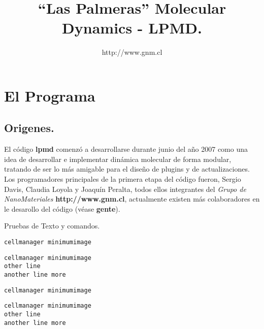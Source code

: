 \documentclass[a4paper,10pt]{scrbook}
\newcommand{\lpmd}{\textbf{lpmd }}
\newcommand{\control}[1]{\begin{center}\begin{minipage}{10cm}\texttt{#1}\end{minipage}\end{center}}
\begin{document}
\author{http://www.gnm.cl}
\title{``Las Palmeras'' Molecular Dynamics - \textbf{LPMD}.}
\maketitle

\tableofcontents
\chapter{El Programa}
\label{chap:lpmd}

\section{Origenes.}

El c\'odigo \lpmd comenz\'o a desarrollarse durante junio del a\~no 2007 como una idea de desarrollar e implementar din\'amica molecular de forma modular, tratando de ser lo m\'as amigable para el dise\~no de plugins y de actualizaciones. Los programadores principales de la primera etapa del c\'odigo fueron, Sergio Davis, Claudia Loyola y Joaqu\'in Peralta, todos ellos integrantes del \textit{Grupo de NanoMateriales} \textbf{http://www.gnm.cl}, actualmente existen m\'as colaboradores en le desarollo del c\'odigo (v\'ease \textbf{gente}).

Pruebas de Texto y comandos.

\begin{center}
\texttt{cellmanager minimumimage}
\end{center}

\control{cellmanager minimumimage \\ other line \\ another line more}


\begin{minipage}[c]{10cm}
 \texttt{cellmanager minimumimage}
\end{minipage}

\begin{center}
 \begin{minipage}[c]{5cm}
 \texttt{cellmanager minimumimage \\ other line \\ another line more}
\end{minipage}
\end{center}
\end{document}
